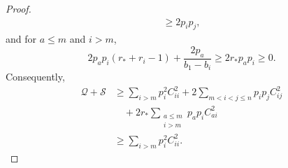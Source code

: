 \documentclass[11pt, reqno]{amsart}
\theoremstyle{remark}
\theoremstyle{definition}
\numberwithin{equation}{section}
\begin{document}
\begin{proof}
\begin{equation*}
\begin{split}
        \ge2p_i p_j,
\end{split}
\end{equation*}
and for $a\le m$ and $i>m$,
\begin{equation*}
        2p_a p_i(r_*+r_i-1)
        +\frac{2p_a}{b_1-b_i}
        \ge2r_*p_a p_i\ge0.
\end{equation*}
Consequently,
\begin{equation}\label{eq:C2-QE-coercive}
\begin{split}
        \mathcal Q+\mathcal S
        &\ge \sum_{i>m}p_i^2C_{ii}^2
          +2\sum_{m<i<j\le n}p_i p_jC_{ij}^2\\
        &\quad
          +2r_*\sum_{\substack{a\le m\\ i>m}}p_a p_iC_{ai}^2\\
        &\ge \sum_{i>m}p_i^2C_{ii}^2.
\end{split}
\end{equation}


\end{proof}
\end{document}
